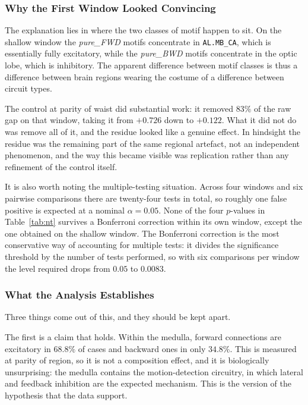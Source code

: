 \documentclass[12pt,a4paper,oneside]{article}
\theoremstyle{definition}
\theoremstyle{plain}
\newcommand{\code}[1]{\texttt{#1}}
\begin{document}
\subsubsection{Why the First Window Looked Convincing}

The explanation lies in where the two classes of motif happen to sit. On the
shallow window the \emph{pure\_FWD} motifs concentrate in
\code{AL.MB\_CA}, which is essentially fully excitatory, while the
\emph{pure\_BWD} motifs concentrate in the optic lobe, which is inhibitory.
The apparent difference between motif classes is thus a difference between
brain regions wearing the costume of a difference between circuit types.

The control at parity of waist did substantial work: it removed $83\%$ of
the raw gap on that window, taking it from $+0.726$ down to $+0.122$. What
it did not do was remove all of it, and the residue looked like a genuine
effect. In hindsight the residue was the remaining part of the same
regional artefact, not an independent phenomenon, and the way this became
visible was replication rather than any refinement of the control itself.

It is also worth noting the multiple-testing situation. Across four windows
and six pairwise comparisons there are twenty-four tests in total, so
roughly one false positive is expected at a nominal $\alpha = 0.05$. None of
the four $p$-values in Table~\ref{tab:nt} survives a Bonferroni correction
within its own window, except the one obtained on the shallow window. The
Bonferroni correction is the most conservative way of accounting for
multiple tests: it divides the significance threshold by the number of tests
performed, so with six comparisons per window the level required drops from
$0.05$ to $0.0083$.

\subsubsection{What the Analysis Establishes}

Three things come out of this, and they should be kept apart.

The first is a claim that holds. Within the medulla, forward connections are
excitatory in $68.8\%$ of cases and backward ones in only $34.8\%$. This is
measured at parity of region, so it is not a composition effect, and it is
biologically unsurprising: the medulla contains the motion-detection
circuitry, in which lateral and feedback inhibition are the expected
mechanism. This is the version of the hypothesis that the data support.
\end{document}
